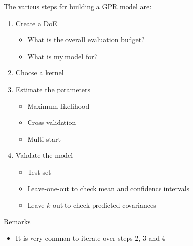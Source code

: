 \documentclass{beamer}
\begin{document}
\begin{frame}{}
The various steps for building a GPR model are:\\ 
\vspace{3mm}
\begin{enumerate}
	\item Create a DoE
		\begin{itemize}
			\item What is the overall evaluation budget?
			\item What is my model for?
		\end{itemize} \vspace{2mm}
	\item Choose a kernel \vspace{3mm}
	\item Estimate the parameters
		\begin{itemize}
			\item Maximum likelihood
			\item Cross-validation
			\item Multi-start
		\end{itemize} \vspace{2mm}
	\item Validate the model 
		\begin{itemize}
			\item Test set 
			\item Leave-one-out to check mean and confidence intervals
			\item Leave-$k$-out to check predicted covariances
		\end{itemize}
\end{enumerate}
\begin{exampleblock}{Remarks}
	\begin{itemize}
		\item It is very common to iterate over steps 2, 3 and 4
	\end{itemize}
\end{exampleblock}
\end{frame}
\end{document}
